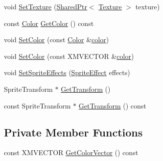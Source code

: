 \begin{DoxyCompactItemize}
\item 
void \hyperlink{classmage_1_1_sprite_image_a12e0ffecc7995f13ccf0374fa37dc4c6}{Set\+Texture} (\hyperlink{namespacemage_a1e01ae66713838a7a67d30e44c67703e}{Shared\+Ptr}$<$ \hyperlink{classmage_1_1_texture}{Texture} $>$ texture)
\item 
const \hyperlink{structmage_1_1_color}{Color} \hyperlink{classmage_1_1_sprite_image_a33dff0d92d5b6505da004ea3587dd0ff}{Get\+Color} () const
\item 
void \hyperlink{classmage_1_1_sprite_image_a3f4ef2e0a24c2e9deeb6827bf438ae21}{Set\+Color} (const \hyperlink{structmage_1_1_color}{Color} \&\hyperlink{namespacemage_a56eceea5a9bceb2b56073f3ea4945781}{color})
\item 
void \hyperlink{classmage_1_1_sprite_image_a936547b1852b2249f03c3187bc354ee8}{Set\+Color} (const X\+M\+V\+E\+C\+T\+OR \&\hyperlink{namespacemage_a56eceea5a9bceb2b56073f3ea4945781}{color})
\item 
void \hyperlink{classmage_1_1_sprite_image_a8f3aab311ee05b38daba8a0fa68d30ad}{Set\+Sprite\+Effects} (\hyperlink{namespacemage_a9cfe18123066ba4236f548f9de75d881}{Sprite\+Effect} effects)
\item 
Sprite\+Transform $\ast$ \hyperlink{classmage_1_1_sprite_image_ab39404c038dde5b6ba6c05df35f80b48}{Get\+Transform} ()
\item 
const Sprite\+Transform $\ast$ \hyperlink{classmage_1_1_sprite_image_a3f49b42a7902421115601c2e5d73e795}{Get\+Transform} () const
\end{DoxyCompactItemize}
\subsection*{Private Member Functions}
\begin{DoxyCompactItemize}
\item 
const X\+M\+V\+E\+C\+T\+OR \hyperlink{classmage_1_1_sprite_image_a08c7f8a40dd8097f849cb0469a12703c}{Get\+Color\+Vector} () const
\end{DoxyCompactItemize}
